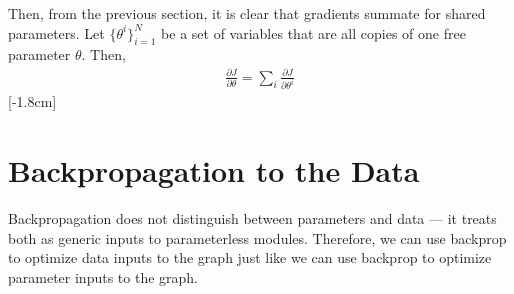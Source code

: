 Then, from the previous section, it is clear that gradients summate for shared parameters. Let $\{\theta^i\}^N_{i=1}$ be a set of variables that are all copies of one free parameter {\setlength{\fboxsep}{2pt}\colorbox{comp_graph_param_bcolor}{$\theta$}}. Then, 
\begin{align}
    \frac{\partial J}{\partial \theta} = \sum_i \frac{\partial J}{\partial \theta^i}
\end{align}[-1.8cm]



\section{Backpropagation to the Data}

Backpropagation does not distinguish between parameters and data — it treats both as generic inputs to parameterless modules. Therefore, we can use backprop to optimize data inputs to the graph just like we can use backprop to optimize parameter inputs to the graph.

